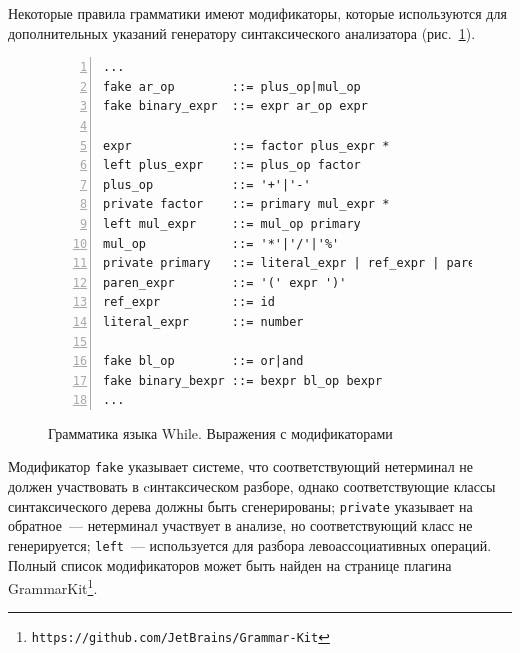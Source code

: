 Некоторые правила грамматики имеют модификаторы, которые используются для дополнительных указаний генератору синтаксического анализатора (рис.~\ref{ov:whileII}).
\begin{figure}[h]
    \begin{lstlisting}[numbers=left, numbersep=3pt, basicstyle=\ttfamily\small, numberstyle=\tiny, frame=bottom, language={}]
...
fake ar_op        ::= plus_op|mul_op
fake binary_expr  ::= expr ar_op expr 

expr              ::= factor plus_expr *
left plus_expr    ::= plus_op factor
plus_op           ::= '+'|'-'
private factor    ::= primary mul_expr *
left mul_expr     ::= mul_op primary
mul_op            ::= '*'|'/'|'%'
private primary   ::= literal_expr | ref_expr | paren_expr
paren_expr        ::= '(' expr ')'
ref_expr          ::= id
literal_expr      ::= number

fake bl_op        ::= or|and
fake binary_bexpr ::= bexpr bl_op bexpr
...
    \end{lstlisting}
    \caption{Грамматика языка While. Выражения с модификаторами}%
    \label{ov:whileII}
\end{figure}
\noindent
Модификатор \lstinline{fake} указывает системе, что соответствующий нетерминал не должен участвовать в cинтаксическом разборе,
однако соответствующие классы синтаксического дерева должны быть сгенерированы;
\lstinline{private} указывает на обратное~--- нетерминал участвует в анализе, но соответствующий класс не генерируется;
\lstinline{left}~--- используется для разбора левоассоциативных операций.
Полный список модификаторов может быть найден на странице плагина
GrammarKit\footnote{\texttt{https://github.com/JetBrains/Grammar-Kit}}.

